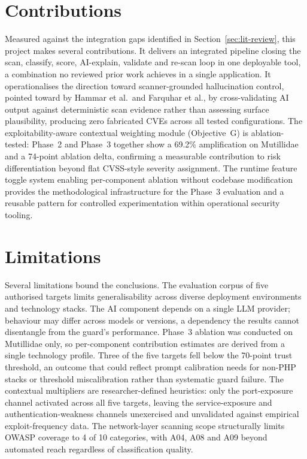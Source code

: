 \documentclass[12pt, a4paper, oneside]{report}
\begin{document}
\section{Contributions}
\label{sec:ch5-contributions}

Measured against the integration gaps identified in Section~\ref{sec:lit-review}, this project makes several contributions. It delivers an integrated pipeline closing the scan, classify, score, AI-explain, validate and re-scan loop in one deployable tool, a combination no reviewed prior work achieves in a single application. It operationalises the direction toward scanner-grounded hallucination control, pointed toward by Hammar et al.\ and Farquhar et al., by cross-validating AI output against deterministic scan evidence rather than assessing surface plausibility, producing zero fabricated CVEs across all tested configurations. The exploitability-aware contextual weighting module (Objective~G) is ablation-tested: Phase~2 and Phase~3 together show a 69.2\% amplification on Mutillidae and a 74-point ablation delta, confirming a measurable contribution to risk differentiation beyond flat CVSS-style severity assignment. The runtime feature toggle system enabling per-component ablation without codebase modification provides the methodological infrastructure for the Phase~3 evaluation and a reusable pattern for controlled experimentation within operational security tooling.

\section{Limitations}
\label{sec:ch5-limitations}

Several limitations bound the conclusions. The evaluation corpus of five authorised targets limits generalisability across diverse deployment environments and technology stacks. The AI component depends on a single LLM provider; behaviour may differ across models or versions, a dependency the results cannot disentangle from the guard's performance. Phase~3 ablation was conducted on Mutillidae only, so per-component contribution estimates are derived from a single technology profile. Three of the five targets fell below the 70-point trust threshold, an outcome that could reflect prompt calibration needs for non-PHP stacks or threshold miscalibration rather than systematic guard failure. The contextual multipliers are researcher-defined heuristics: only the port-exposure channel activated across all five targets, leaving the service-exposure and authentication-weakness channels unexercised and unvalidated against empirical exploit-frequency data. The network-layer scanning scope structurally limits OWASP coverage to 4 of 10 categories, with A04, A08 and A09 beyond automated reach regardless of classification quality.
\end{document}
